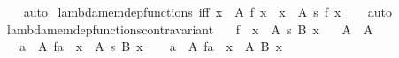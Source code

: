 \begin{isabellebody}
%
\isadelimproof
\ \ %
\endisadelimproof
%
\isatagproof
{}\isamarkupfalse%
\ auto%
\endisatagproof
{\isafoldproof}%
%
\isadelimproof
\isanewline
%
\endisadelimproof
\isanewline
{}\isamarkupfalse%
\ lambda{\isacharunderscore}{\kern0pt}mem{\isacharunderscore}{\kern0pt}dep{\isacharunderscore}{\kern0pt}functions\ {\isacharbrackleft}{\kern0pt}iff{\isacharbrackright}{\kern0pt}{\isacharcolon}{\kern0pt}\ {\isachardoublequoteopen}{\isacharparenleft}{\kern0pt}{\isasymlambda}x\ {\isasymin}\ A{\isachardot}{\kern0pt}\ f\ x{\isacharparenright}{\kern0pt}\ {\isasymin}\ {\isacharparenleft}{\kern0pt}x\ {\isasymin}\ A{\isacharparenright}{\kern0pt}\ {\isasymrightarrow}s\ {\isacharbraceleft}{\kern0pt}f\ x{\isacharbraceright}{\kern0pt}{\isachardoublequoteclose}\isanewline
%
\isadelimproof
\ \ %
\endisadelimproof
%
\isatagproof
{}\isamarkupfalse%
\ auto%
\endisatagproof
{\isafoldproof}%
%
\isadelimproof
\isanewline
%
\endisadelimproof
\isanewline
{}\isamarkupfalse%
\ lambda{\isacharunderscore}{\kern0pt}mem{\isacharunderscore}{\kern0pt}dep{\isacharunderscore}{\kern0pt}functions{\isacharunderscore}{\kern0pt}contravariant{\isacharcolon}{\kern0pt}\isanewline
\ \ \ {\isachardoublequoteopen}f\ {\isasymin}\ {\isacharparenleft}{\kern0pt}x\ {\isasymin}\ A{\isacharparenright}{\kern0pt}\ {\isasymrightarrow}s\ {\isacharparenleft}{\kern0pt}B\ x{\isacharparenright}{\kern0pt}{\isachardoublequoteclose}\isanewline
\ \ \ {\isachardoublequoteopen}A{\isacharprime}{\kern0pt}\ {\isasymsubseteq}\ A{\isachardoublequoteclose}\isanewline
\ \ \ {\isachardoublequoteopen}{\isacharparenleft}{\kern0pt}{\isasymlambda}a\ {\isasymin}\ A{\isacharprime}{\kern0pt}{\isachardot}{\kern0pt}\ f{\isacharbackquote}{\kern0pt}a{\isacharparenright}{\kern0pt}\ {\isasymin}\ {\isacharparenleft}{\kern0pt}x\ {\isasymin}\ A{\isacharprime}{\kern0pt}{\isacharparenright}{\kern0pt}\ {\isasymrightarrow}s\ {\isacharparenleft}{\kern0pt}B\ x{\isacharparenright}{\kern0pt}{\isachardoublequoteclose}\isanewline
%
\isadelimproof
%
\endisadelimproof
%
\isatagproof
{}\isamarkupfalse%
\isanewline
\ \ \isamarkupfalse%
\ {\isachardoublequoteopen}{\isacharparenleft}{\kern0pt}{\isasymlambda}a\ {\isasymin}\ A{\isacharprime}{\kern0pt}{\isachardot}{\kern0pt}\ f{\isacharbackquote}{\kern0pt}a{\isacharparenright}{\kern0pt}\ {\isasymsubseteq}\ {\isasymSum}x\ {\isasymin}\ A{\isacharprime}{\kern0pt}{\isachardot}{\kern0pt}\ {\isacharparenleft}{\kern0pt}B\ x{\isacharparenright}{\kern0pt}{\isachardoublequoteclose}\isanewline

\end{isabellebody}
